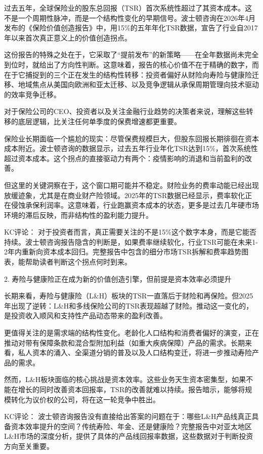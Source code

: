\documentclass[11pt]{ctexart}
\begin{document}
过去五年，全球保险业的股东总回报（TSR）首次系统性超过了其资本成本。这不是一个周期性脉冲，而是一个结构性变化的早期信号。波士顿咨询在2026年4月发布的《保险价值创造报告》中，用15\%的五年年化TSR数据，宣告了行业自2017年以来首次真正意义上的价值创造拐点。

这份报告的特殊之处在于，它采取了“提前发布”的新策略——在全年数据尚未完全到位时，就给出了方向性判断。这意味着，报告的核心价值不在于精确的数字，而在于它捕捉到的三个正在发生的结构性转移：投资者偏好从财险向寿险与健康险迁移、地域焦点从美国向欧洲和亚太迁移、以及竞争逻辑从承保周期管理向技术驱动的效率竞争迁移。

对于保险公司的CEO、投资者以及关注金融行业趋势的决策者来说，理解这些转移的底层逻辑，比关注任何单季度的保费增速都更重要。

保险业长期面临一个尴尬的现实：尽管保费规模巨大，但股东回报长期徘徊在资本成本附近。波士顿咨询的数据显示，过去五年行业年化TSR达到15\%，首次系统性超过资本成本。这个拐点的直接驱动力有两个：疫情影响的消退和当前盈利的改善。

但这里的关键洞察在于，这个窗口期可能并不稳定。财险业务的费率动能已经出现放缓迹象，尤其是在商业财产险领域。2025年的TSR数据已经显示，费率软化正在侵蚀承保利润率。这意味着，行业跑赢资本成本的状态，更多是过去几年硬市场环境的滞后反映，而非结构性的盈利能力提升。

KC评论： 对于投资者而言，真正需要关注的不是15\%这个数字本身，而是它能否持续。波士顿咨询报告隐含的判断是，如果费率继续软化，行业TSR可能在未来1-2年内重新向资本成本回归。完整报告中包含的细分市场TSR拆解和费率趋势图表，能帮助读者判断这个拐点何时到来。

2. 寿险与健康险正在成为新的价值创造引擎，但前提是资本效率必须提升

长期来看，寿险与健康险（L\&H）板块的TSR一直落后于财险和再保险。但2025年出现了逆转：L\&H和多线保险公司的TSR表现超越了财险。推动这一变化的，是投资收入顺风和支持性产品动态带来的盈利改善。

更值得关注的是需求端的结构性变化。老龄化人口结构和消费者偏好的演变，正在推动对带有保障条款和混合型附加利益（如重大疾病保障）产品的需求。长期来看，私人资本的涌入、全渠道分销的普及以及人口结构变迁，将进一步推动寿险产品的需求。

然而，L\&H板块面临的核心挑战是资本效率。这些业务天生资本密集型，如果不能在增长的同时改善资本回报率，TSR的改善就难以持续。报告暗示，能够将规模转化为议价权的公司，将在这一轮竞争中胜出。

KC评论： 波士顿咨询报告没有直接给出答案的问题在于：哪些L\&H产品线真正具备资本效率提升的空间？传统寿险、年金、还是健康险？完整报告中对亚太地区L\&H市场的深度分析，提供了具体的产品线回报率数据，这些数据对于判断投资方向至关重要。
\end{document}
